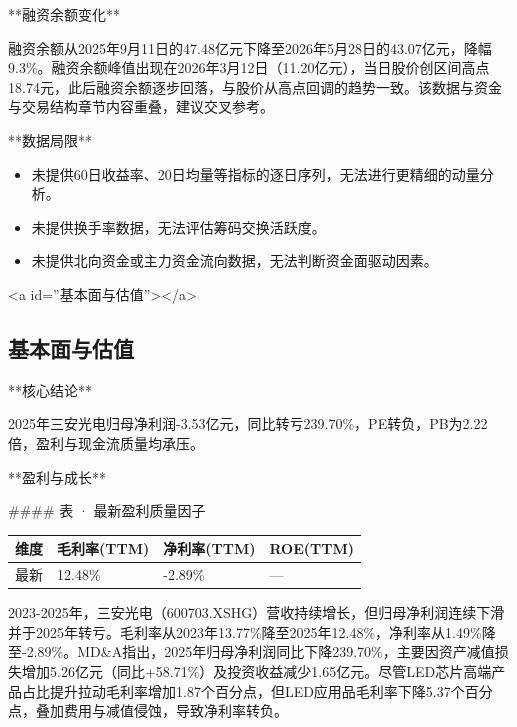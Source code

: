 \documentclass[12pt,a4paper]{article}
\begin{document}
**融资余额变化**

融资余额从2025年9月11日的47.48亿元下降至2026年5月28日的43.07亿元，降幅9.3\%。融资余额峰值出现在2026年3月12日（11.20亿元），当日股价创区间高点18.74元，此后融资余额逐步回落，与股价从高点回调的趋势一致。该数据与资金与交易结构章节内容重叠，建议交叉参考。

**数据局限**

\begin{itemize}
\item 未提供60日收益率、20日均量等指标的逐日序列，无法进行更精细的动量分析。
\item 未提供换手率数据，无法评估筹码交换活跃度。
\item 未提供北向资金或主力资金流向数据，无法判断资金面驱动因素。
\end{itemize}

<a id=''基本面与估值''></a>

\subsection{ 基本面与估值}

**核心结论**

2025年三安光电归母净利润-3.53亿元，同比转亏239.70\%，PE转负，PB为2.22倍，盈利与现金流质量均承压。

**盈利与成长**

\#\#\#\# 表 · 最新盈利质量因子

\begin{table}[htbp]
\centering
\begin{tabular}{llll}
\toprule
维度 & 毛利率(TTM) & 净利率(TTM) & ROE(TTM) \\
\midrule
最新 & 12.48\% & -2.89\% & — \\
\bottomrule
\end{tabular}
\end{table}


2023-2025年，三安光电（600703.XSHG）营收持续增长，但归母净利润连续下滑并于2025年转亏。毛利率从2023年13.77\%降至2025年12.48\%，净利率从1.49\%降至-2.89\%。MD\&A指出，2025年归母净利润同比下降239.70\%，主要因资产减值损失增加5.26亿元（同比+58.71\%）及投资收益减少1.65亿元。尽管LED芯片高端产品占比提升拉动毛利率增加1.87个百分点，但LED应用品毛利率下降5.37个百分点，叠加费用与减值侵蚀，导致净利率转负。
\end{document}
